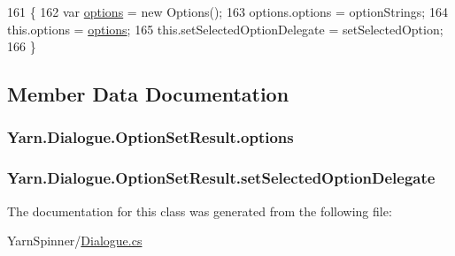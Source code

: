 \begin{DoxyCode}
161                                                                                                   \{
162                 var \hyperlink{a00119_abda9c3047ff9d3c3ec5540566a239315}{options} = \textcolor{keyword}{new} Options();
163                 options.options = optionStrings;
164                 this.options = \hyperlink{a00119_abda9c3047ff9d3c3ec5540566a239315}{options};
165                 this.setSelectedOptionDelegate = setSelectedOption;
166             \}
\end{DoxyCode}


\subsection{Member Data Documentation}
\hypertarget{a00119_abda9c3047ff9d3c3ec5540566a239315}{
\subsubsection[{options}]{ Yarn.\-Dialogue.\-Option\-Set\-Result.\-options}}\label{a00119_abda9c3047ff9d3c3ec5540566a239315}
\hypertarget{a00119_a6f2683598cf0f62b76bb864640cc79dd}{
\subsubsection[{set\-Selected\-Option\-Delegate}]{ Yarn.\-Dialogue.\-Option\-Set\-Result.\-set\-Selected\-Option\-Delegate}}\label{a00119_a6f2683598cf0f62b76bb864640cc79dd}


The documentation for this class was generated from the following file\-:\begin{DoxyCompactItemize}
\item 
Yarn\-Spinner/\hyperlink{a00265}{Dialogue.\-cs}\end{DoxyCompactItemize}
